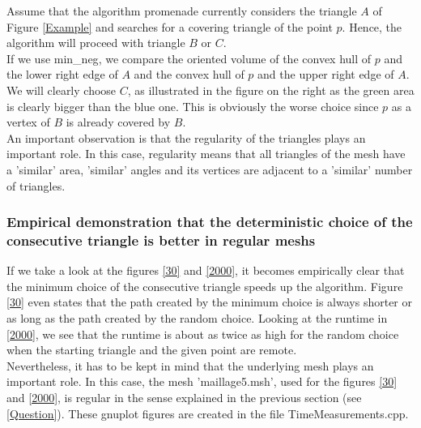 \documentclass[10pt]{article}
\begin{document}
	Assume that the algorithm {\ttfamily promenade} currently considers  the triangle $ A $ of Figure \ref{Example} and searches for a covering triangle of the point $ p $.
	Hence, the algorithm will proceed with triangle $ B $ or $ C $. \\
	 If we use {\ttfamily min\_neg}, we compare the oriented volume of the convex hull of $ p $ and the lower right edge of $ A $ and the convex hull of $p$ and the upper right edge of $ A $. We will clearly choose $ C $, as illustrated in the figure on the right as the green area is clearly bigger than the blue one. This is obviously the worse choice since $p$ as a vertex of $B$ is already covered by $ B $.  \\
	 An important observation is that the regularity of the triangles plays an important role. In this case, regularity means that all triangles of the mesh have a 'similar' area, 'similar' angles and its vertices are adjacent to a 'similar' number of triangles.



\subsubsection{Empirical demonstration that the deterministic choice of the consecutive triangle is better in regular meshs}
If we take a look at the figures \ref{30} and \ref{2000}, it becomes empirically clear that the minimum choice of the consecutive triangle speeds up the algorithm. Figure \ref{30} even states that the path created by the minimum choice is always shorter or as long as the path created by the random choice. Looking at the runtime in \ref{2000}, we see that the runtime is about as twice as high for the random choice when the starting triangle and the given point are remote. 
 \\
Nevertheless, it has to be kept in mind that the underlying mesh plays an important role.
In this case, the mesh 'maillage5.msh', used for the figures \ref{30} and \ref{2000}, is regular in the sense explained in the previous section (see \ref{Question}). These {\ttfamily gnuplot} figures are created in the file TimeMeasurements.cpp.
\end{document}
